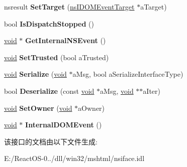 \begin{DoxyCompactItemize}
nsresult {\bfseries Set\+Target} (\hyperlink{interfacens_i_d_o_m_event_target}{ns\+I\+D\+O\+M\+Event\+Target} $\ast$a\+Target)
\item 
\mbox{\label{interfacens_i_d_o_m_event_aa5170f4e3fe4c79229655c18d337b6f9}} 
bool {\bfseries Is\+Dispatch\+Stopped} ()
\item 
\mbox{\label{interfacens_i_d_o_m_event_a3e3c57180d2329b30e9c258ecfa9a7bd}} 
\hyperlink{interfacevoid}{void} $\ast$ {\bfseries Get\+Internal\+N\+S\+Event} ()
\item 
\mbox{\label{interfacens_i_d_o_m_event_ab87223c539ad5e764ea1a58df40bb008}} 
\hyperlink{interfacevoid}{void} {\bfseries Set\+Trusted} (bool a\+Trusted)
\item 
\mbox{\label{interfacens_i_d_o_m_event_a5cc21a37c231e1a59d6a3a59123c8ff7}} 
\hyperlink{interfacevoid}{void} {\bfseries Serialize} (\hyperlink{interfacevoid}{void} $\ast$a\+Msg, bool a\+Serialize\+Interface\+Type)
\item 
\mbox{\label{interfacens_i_d_o_m_event_a04b07cc58b38c9cb55a016dd1bac2860}} 
bool {\bfseries Deserialize} (const \hyperlink{interfacevoid}{void} $\ast$a\+Msg, \hyperlink{interfacevoid}{void} $\ast$$\ast$a\+Iter)
\item 
\mbox{\label{interfacens_i_d_o_m_event_aea4963e82dc4b99b4549ed17d5e158ca}} 
\hyperlink{interfacevoid}{void} {\bfseries Set\+Owner} (\hyperlink{interfacevoid}{void} $\ast$a\+Owner)
\item 
\mbox{\label{interfacens_i_d_o_m_event_abaeef92321f8ccbd32602adf2e115820}} 
\hyperlink{interfacevoid}{void} $\ast$ {\bfseries Internal\+D\+O\+M\+Event} ()
\end{DoxyCompactItemize}


该接口的文档由以下文件生成\+:\begin{DoxyCompactItemize}
\item 
E\+:/\+React\+O\+S-\/0../dll/win32/mshtml/nsiface.\+idl\end{DoxyCompactItemize}
